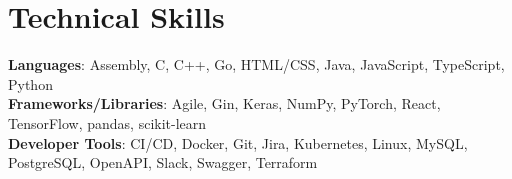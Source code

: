 \documentclass[letterpaper,11pt]{article}
\makeatletter
\newcommand{\resumeItem}[1]{
    \item\small{
      {#1 \vspace{-2pt}}
    }
  }
\newcommand{\resumeProjectHeading}[2]{
      \item
      \begin{tabular*}{0.97\textwidth}{l@{\extracolsep{\fill}}r}
        \small#1 & #2 \\
      \end{tabular*}\vspace{-7pt}
  }
\newcommand{\resumeSubHeadingListStart}{\begin{itemize}[leftmargin=0.15in, label={}]}
\newcommand{\resumeSubHeadingListEnd}{\end{itemize}}
\newcommand{\resumeItemListStart}{\begin{itemize}}
\newcommand{\resumeItemListEnd}{\end{itemize}\vspace{-5pt}}
\makeatother
\begin{document}

\section{Technical Skills}

  \begin{itemize}[leftmargin=0.15in, label={}]
    \small{\item{
      \textbf{Languages}{: Assembly, C, C++, Go, HTML/CSS, Java, JavaScript, TypeScript, Python} \\
      \textbf{Frameworks/Libraries}{: Agile, Gin, Keras, NumPy, PyTorch, React, TensorFlow, pandas, scikit-learn} \\
      \textbf{Developer Tools}{: CI/CD, Docker, Git, Jira, Kubernetes, Linux, MySQL, PostgreSQL, OpenAPI, Slack, Swagger, Terraform}}}
  \end{itemize}
\end{document}
